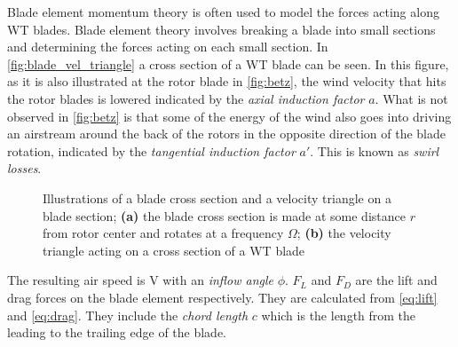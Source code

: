 Blade element momentum theory is often used to model the forces acting along WT blades. Blade element theory involves breaking a blade into small sections and determining the forces acting on each small section. In \cref{fig:blade_vel_triangle} a cross section of a WT blade can be seen. In this figure, as it is also illustrated at the rotor blade in \cref{fig:betz}, the wind velocity that hits the rotor blades is lowered indicated by the \textit{axial induction factor} $ a $. What is not observed in \cref{fig:betz} is that some of the energy of the wind also goes into driving an airstream around the back of the rotors in the opposite direction of the blade rotation, indicated by the \textit{tangential induction factor} $ a' $. This is known as \textit{swirl losses}.
\begin{figure}[h]
	\centering
	\hfil
	\caption{Illustrations of a blade cross section and a velocity triangle on a blade section; \textbf{(a)} the blade cross section is made at some distance $ r $ from rotor center and rotates at a frequency $ \Omega $; \textbf{(b)} the velocity triangle acting on a cross section of a WT blade}
	\label{fig:blade_triangles}
\end{figure}
The resulting air speed is V with an \textit{inflow angle} $ \phi $. $ F_L $ and $ F_D $ are the lift and drag forces on the blade element respectively. They are calculated from \cref{eq:lift} and \cref{eq:drag}. They include the \textit{chord length} $ c $ which is the length from the leading to the trailing edge of the blade.
